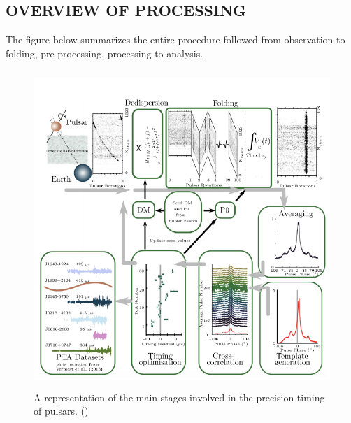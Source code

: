 \documentclass{article}
\begin{document}
\subsection{OVERVIEW OF PROCESSING}
The figure below summarizes the entire procedure followed from observation to folding, pre-processing, processing to analysis. 
\begin{figure}[htp]
    \centering
    \includegraphics[height=12cm,width=12cm]{Images/V2_4.png}
    \caption{A representation of the main stages involved in the precision timing of pulsars. (\cite{taylor2021nanohertz})}
\end{figure}
\end{document}
